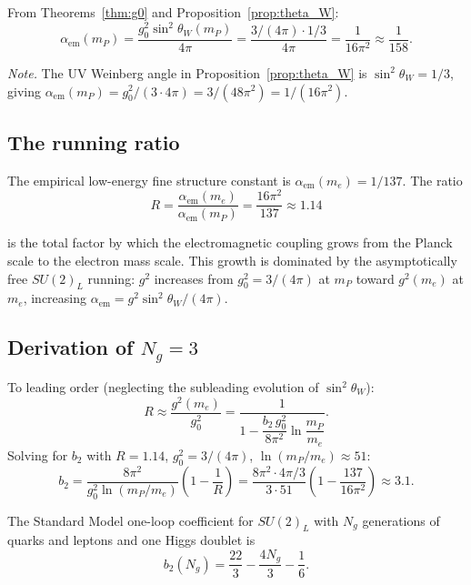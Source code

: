 \documentclass[12pt]{article}
\theoremstyle{definition}
\theoremstyle{remark}
\begin{document}
From Theorems~\ref{thm:g0} and Proposition~\ref{prop:theta_W}:
\begin{equation}
\alpha_{\mathrm{em}}(m_P)=\frac{g_0^2\sin^2\theta_W(m_P)}{4\pi}
=\frac{3/(4\pi)\cdot 1/3}{4\pi}=\frac{1}{16\pi^2}\approx\frac{1}{158}.
\end{equation}

\noindent\textit{Note.}  The UV Weinberg angle in
Proposition~\ref{prop:theta_W} is $\sin^2\theta_W=1/3$, giving
$\alpha_{\mathrm{em}}(m_P)=g_0^2/(3\cdot 4\pi)=3/(48\pi^2)=1/(16\pi^2)$.

\subsection{The running ratio}

The empirical low-energy fine structure constant is
$\alpha_{\mathrm{em}}(m_e)=1/137$.  The ratio
\begin{equation}
R=\frac{\alpha_{\mathrm{em}}(m_e)}{\alpha_{\mathrm{em}}(m_P)}
=\frac{16\pi^2}{137}\approx 1.14
\end{equation}

\noindent is the total factor by which the electromagnetic coupling grows
from the Planck scale to the electron mass scale.  This growth is dominated
by the asymptotically free $SU(2)_L$ running: $g^2$ increases from
$g_0^2=3/(4\pi)$ at $m_P$ toward $g^2(m_e)$ at $m_e$, increasing
$\alpha_{\mathrm{em}}=g^2\sin^2\theta_W/(4\pi)$.

\subsection{Derivation of $N_g=3$}

To leading order (neglecting the subleading evolution of $\sin^2\theta_W$):
\begin{equation}
R\approx\frac{g^2(m_e)}{g_0^2}=\frac{1}{1-\dfrac{b_2\,g_0^2}{8\pi^2}
\ln\dfrac{m_P}{m_e}}.
\label{eq:Rapprox}
\end{equation}
Solving for $b_2$ with $R=1.14$, $g_0^2=3/(4\pi)$,
$\ln(m_P/m_e)\approx 51$:
\begin{equation}
b_2=\frac{8\pi^2}{g_0^2\ln(m_P/m_e)}\left(1-\frac{1}{R}\right)
=\frac{8\pi^2\cdot 4\pi/3}{3\cdot 51}\left(1-\frac{137}{16\pi^2}\right)
\approx 3.1.
\label{eq:b2req}
\end{equation}

The Standard Model one-loop coefficient for $SU(2)_L$ with $N_g$
generations of quarks and leptons and one Higgs doublet is
\begin{equation}
b_2(N_g)=\frac{22}{3}-\frac{4N_g}{3}-\frac{1}{6}.
\end{equation}
\end{document}
